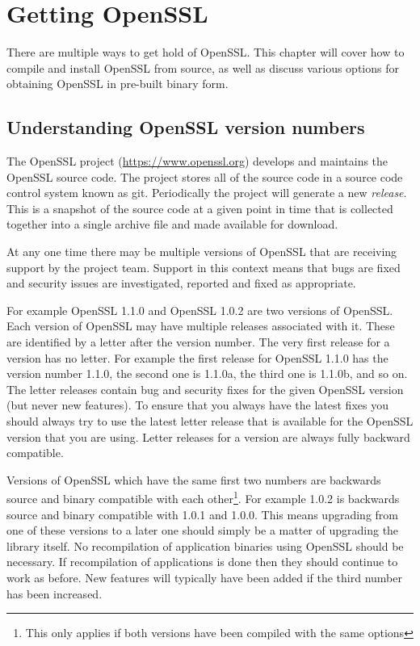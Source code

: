 \chapter{Getting OpenSSL}

There are multiple ways to get hold of OpenSSL. This chapter will cover
how to compile and install OpenSSL from source, as well as discuss various
options for obtaining OpenSSL in pre-built binary form.

\section{Understanding OpenSSL version numbers}

The OpenSSL project (\url{https://www.openssl.org}) develops and
maintains the OpenSSL source code. The project stores all of the source
code in a source code control system known as git. Periodically the
project will generate a new \emph{release}. This is a snapshot of the source
code at a given point in time that is collected together into a single archive
file and made available for download.

At any one time there may be multiple versions of OpenSSL that are receiving
support by the project team. Support in this context means that bugs are
fixed and security issues are investigated, reported and fixed as appropriate.

For example OpenSSL 1.1.0 and OpenSSL 1.0.2 are two versions of OpenSSL. Each
version of OpenSSL may have multiple releases associated with it. These are
identified by a letter after the version number. The very first release for
a version has no letter. For example the first release for OpenSSL 1.1.0 has
the version number 1.1.0, the second one is 1.1.0a, the third one is 1.1.0b,
and so on. The letter releases contain bug and security fixes for the given
OpenSSL version (but never new features). To ensure that you always have the
latest fixes you should always try to use the latest letter release that is
available for the OpenSSL version that you are using. Letter releases for a
version are always fully backward compatible.

Versions of OpenSSL which have the same first two numbers are backwards source
and binary compatible with each other\footnote{This only applies if both versions
have been compiled with the same options}. For example 1.0.2 is backwards
source and binary compatible with 1.0.1 and 1.0.0. This means upgrading from
one of these versions to a later one should simply be a matter of upgrading the
library itself. No recompilation of application binaries using OpenSSL should be
necessary. If recompilation of applications is done then they should continue to
work as before. New features will typically have been added if the third number
has been increased.

